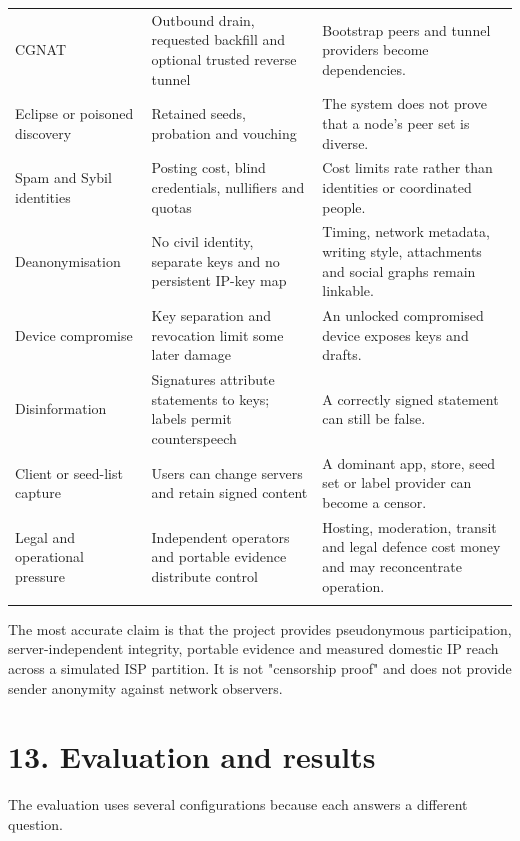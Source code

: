 \documentclass[12pt,a4paper]{article}
\begin{document}
\begin{small}
\begin{longtable}{@{}>{\raggedright\arraybackslash}p{}>{\raggedright\arraybackslash}p{}>{\raggedright\arraybackslash}p{}@{}}
\addlinespace[2pt]
CGNAT & Outbound drain, requested backfill and optional trusted reverse tunnel & Bootstrap peers and tunnel providers become dependencies. \\
\addlinespace[2pt]
Eclipse or poisoned discovery & Retained seeds, probation and vouching & The system does not prove that a node's peer set is diverse. \\
\addlinespace[2pt]
Spam and Sybil identities & Posting cost, blind credentials, nullifiers and quotas & Cost limits rate rather than identities or coordinated people. \\
\addlinespace[2pt]
Deanonymisation & No civil identity, separate keys and no persistent IP-key map & Timing, network metadata, writing style, attachments and social graphs remain linkable. \\
\addlinespace[2pt]
Device compromise & Key separation and revocation limit some later damage & An unlocked compromised device exposes keys and drafts. \\
\addlinespace[2pt]
Disinformation & Signatures attribute statements to keys; labels permit counterspeech & A correctly signed statement can still be false. \\
\addlinespace[2pt]
Client or seed-list capture & Users can change servers and retain signed content & A dominant app, store, seed set or label provider can become a censor. \\
\addlinespace[2pt]
Legal and operational pressure & Independent operators and portable evidence distribute control & Hosting, moderation, transit and legal defence cost money and may reconcentrate operation. \\
\addlinespace[2pt]
\end{longtable}
\end{small}
The most accurate claim is that the project provides pseudonymous participation, server-independent integrity, portable evidence and measured domestic IP reach across a simulated ISP partition. It is not "censorship proof" and does not provide sender anonymity against network observers.

\section*{13. Evaluation and results}
The evaluation uses several configurations because each answers a different question.
\end{document}
